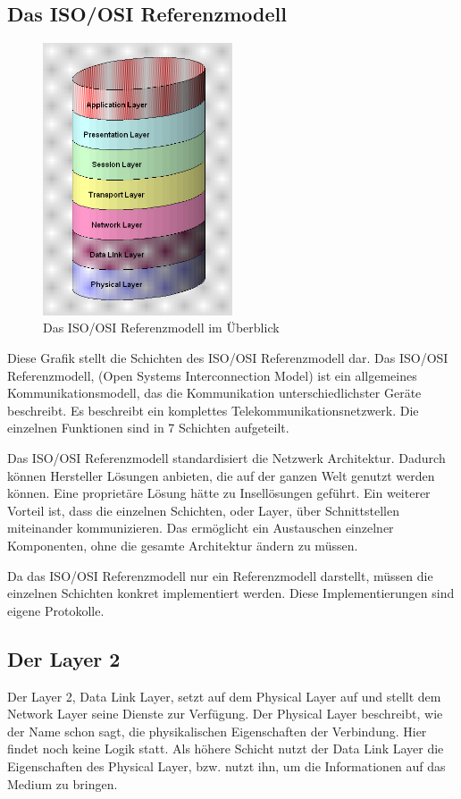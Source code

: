 \documentclass[12pt, a4paper, ngerman]{article}
\newcommand{\osi}{ISO/OSI Referenzmodell\xspace}
\begin{document}
\subsection{Das \osi}
\begin{figure}[h]
\includegraphics[width=0.5\textwidth]{Grafiken/osi_modell.jpg}
\caption{Das \osi im Überblick \cite{osi_modell}}
\label{osi_modell}
\end{figure} 
Diese Grafik stellt die Schichten des \osi dar. Das \osi, (Open Systems Interconnection Model) ist ein allgemeines Kommunikationsmodell,  das die Kommunikation unterschiedlichster Geräte beschreibt. Es beschreibt ein komplettes Telekommunikationsnetzwerk. Die einzelnen Funktionen sind in 7 Schichten aufgeteilt. 

Das \osi standardisiert die Netzwerk Architektur. Dadurch können Hersteller Lösungen anbieten, die auf der ganzen Welt genutzt werden können. Eine proprietäre Lösung hätte zu Insellösungen geführt. Ein weiterer Vorteil ist, dass die einzelnen Schichten, oder Layer, über Schnittstellen miteinander kommunizieren. Das ermöglicht ein Austauschen einzelner Komponenten, ohne die gesamte Architektur ändern zu müssen.

Da das \osi nur ein Referenzmodell darstellt, müssen die einzelnen Schichten konkret implementiert werden. Diese Implementierungen sind eigene Protokolle. 

\subsection{Der Layer 2}
Der Layer 2, Data Link Layer, setzt auf dem Physical Layer auf und stellt dem Network Layer seine Dienste zur Verfügung. Der Physical Layer beschreibt, wie der Name schon sagt, die physikalischen Eigenschaften der Verbindung.  Hier findet noch keine Logik statt. Als höhere Schicht nutzt der Data Link Layer die Eigenschaften des Physical Layer, bzw. nutzt ihn, um die Informationen auf das Medium zu bringen.
\end{document}
